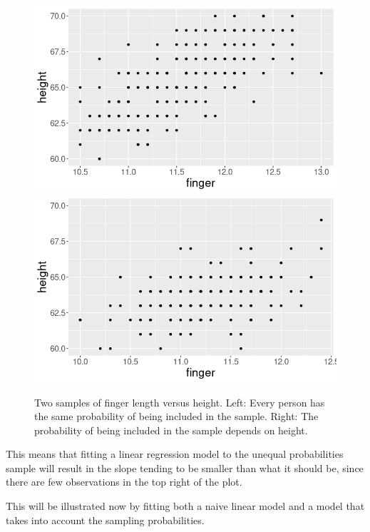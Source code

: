 \documentclass{article}
\begin{document}
\begin{example}
\begin{figure}
  \label{fig:anthSamples}
  \includegraphics[scale = 0.4]{example1_SRS.png}
  \includegraphics[scale = 0.4]{example1_UNEQ.png}
  \caption{Two samples of finger length versus height. Left: Every person has the same
    probability of being included in the sample. Right: The probability of being
  included in the sample depends on height.}
\end{figure}


This means that fitting a linear regression model to the unequal probabilities
sample will result in the slope tending to be smaller than what it should be, since there are few observations in the top right of the plot.

This will be illustrated now by fitting both a naive linear model and a model that takes into account the sampling probabilities.


\begin{figure}
  \centering
  

\end{figure}
\end{example}
\end{document}
